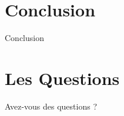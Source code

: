 \documentclass{beamer}
\begin{document}
\begin{darkframes}
         \section{Conclusion}
 \begin{frame}
   	 \begin{center}
  \Huge	 Conclusion
  		\end{center}
    \end{frame}
    
     \section{Les Questions}
 \begin{frame}
   	 \begin{center}
  	 \Huge	 Avez-vous des questions ?
  		\end{center}
    \end{frame}
    
  \end{darkframes}
\end{document}
